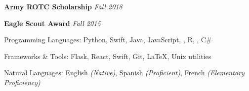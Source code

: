 \documentclass[10pt,letterpaper]{article}
\begin{document}
\spacedhrule{0.5em}{-0.4em}


\headedsection
  {\textbf{Army ROTC Scholarship}}
  {\emph{Fall 2018}}
  {}

\headedsection
  {\textbf{Eagle Scout Award}}
  {\emph{Fall 2015}}
  {}

\spacedhrule{0.5em}{-0.4em}


\inlineheadsection
  {Programming Languages:}
  {Python, Swift, Java, JavaScript, , R, , C\#}

\inlineheadsection
  {Frameworks \& Tools:}
  {Flask, React, Swift, Git, \LaTeX, Unix utilities}

\inlineheadsection
  {Natural Languages:}
  {English \emph{(Native)}, Spanish \emph{(Proficient)}, French \emph{(Elementary Proficiency)}}
\end{document}
